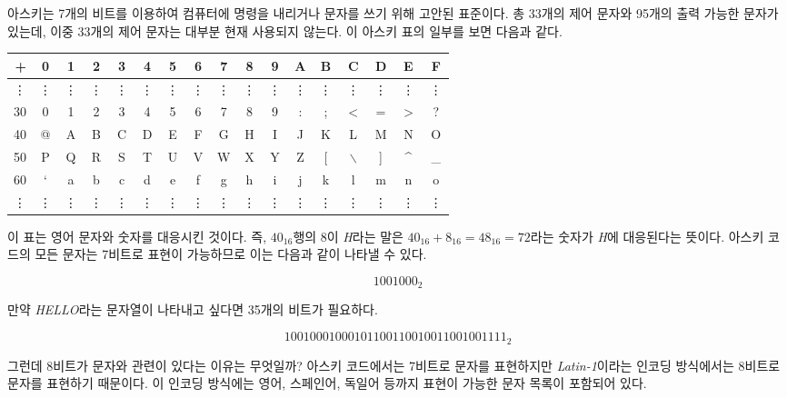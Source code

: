 \documentclass{article}
\begin{document}
아스키는 7개의 비트를 이용하여 컴퓨터에 명령을 내리거나 문자를 쓰기 위해 고안된 표준이다.
총 33개의 제어 문자와 95개의 출력 가능한 문자가 있는데, 이중 33개의 제어 문자는 대부분 현재
사용되지 않는다. 이 아스키 표의 일부를 보면 다음과 같다.

\begin{center}
    \begin{tabular}{r|cccccccccccccccc}
        + & 0 & 1 & 2 & 3 & 4 & 5 & 6 & 7 & 8 & 9 & A & B & C & D & E & F \\
        \hline
        \vdots & \vdots & \vdots & \vdots & \vdots & \vdots & \vdots & \vdots & \vdots & \vdots & \vdots & \vdots & \vdots & \vdots & \vdots & \vdots & \vdots \\
        30 & 0 & 1 & 2 & 3 & 4 & 5 & 6 & 7 & 8 & 9 & : & ; & $<$ & = & $>$ & ? \\
        40 & @ & A & B & C & D & E & F & G & H & I & J & K & L & M & N & O \\
        50 & P & Q & R & S & T & U & V & W & X & Y & Z & [ & $\backslash$ & ] & \^{} & \_{} \\
        60 & ` & a & b & c & d & e & f & g & h & i & j & k & l & m & n & o \\
        \vdots & \vdots & \vdots & \vdots & \vdots & \vdots & \vdots & \vdots & \vdots & \vdots & \vdots & \vdots & \vdots & \vdots & \vdots & \vdots & \vdots
    \end{tabular}
\end{center}

이 표는 영어 문자와 숫자를 대응시킨 것이다. 즉, $40_{16}$행의 8이 \textit{H}라는 말은
$40_{16}+8_{16} = 48_{16} = 72$라는
숫자가 \textit{H}에 대응된다는 뜻이다. 아스키 코드의 모든 문자는 7비트로 표현이 가능하므로 이는
다음과 같이 나타낼 수 있다.

$$
1001000_2
$$

만약 \textit{HELLO}라는 문자열이 나타내고 싶다면 35개의 비트가 필요하다.

$$
1001000 1000101 1001100 1001100 1001111 _2
$$

그런데 8비트가 문자와 관련이 있다는 이유는 무엇일까?
아스키 코드에서는 7비트로 문자를 표현하지만 \textit{Latin-1}이라는 인코딩 방식에서는 8비트로 문자를
표현하기 때문이다. 이 인코딩 방식에는 영어, 스페인어, 독일어 등까지 표현이 가능한 문자 목록이
포함되어 있다.
\end{document}
